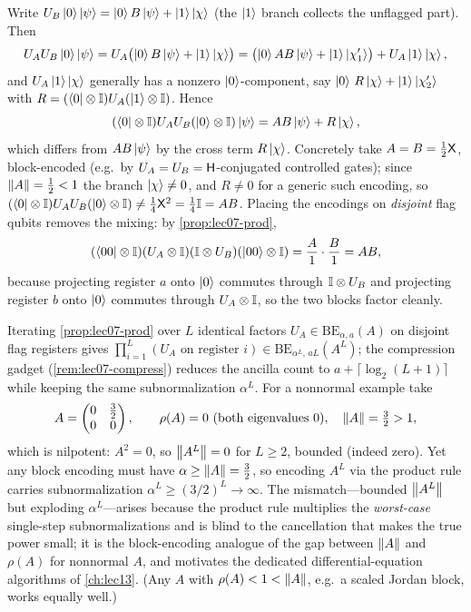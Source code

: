 \begin{solution}
Write $U_B\ket0\ket\psi=\ket0 B\ket\psi+\ket1\ket\chi$ (the $\ket1$ branch collects
the unflagged part). Then
\[
  U_A U_B\ket0\ket\psi
  =U_A\bigl(\ket0 B\ket\psi+\ket1\ket\chi\bigr)
  =\bigl(\ket0 A B\ket\psi+\ket1\ket{\chi'_1}\bigr)
   +U_A\ket1\ket\chi,
\]
and $U_A\ket1\ket\chi$ generally has a nonzero $\ket0$-component, say
$\ket0\,R\ket\chi+\ket1\ket{\chi'_2}$ with $R=(\bra0\otimes\mathbb{I})U_A(\ket1\otimes\mathbb{I})$.
Hence
\[
  (\bra0\otimes\mathbb{I})U_AU_B(\ket0\otimes\mathbb{I})\ket\psi=AB\ket\psi+R\ket\chi,
\]
which differs from $AB\ket\psi$ by the cross term $R\ket\chi$. Concretely take
$A=B=\tfrac12\mathsf{X}$, block-encoded (e.g.\ by $U_A=U_B=\mathsf{H}$-conjugated controlled
gates); since $\left\lVert A \right\rVert=\tfrac12<1$ the branch $\ket\chi\ne0$, and $R\ne0$ for a
generic such encoding, so $(\bra0\otimes\mathbb{I})U_AU_B(\ket0\otimes\mathbb{I})\ne\tfrac14\mathsf{X}^2
=\tfrac14\mathbb{I}=AB$. Placing the encodings on \emph{disjoint} flag qubits removes the
mixing: by \cref{prop:lec07-prod},
\[
  (\bra{00}\otimes\mathbb{I})(U_A\otimes\mathbb{I})(\mathbb{I}\otimes U_B)(\ket{00}\otimes\mathbb{I})
  =\frac{A}{1}\cdot\frac{B}{1}=AB,
\]
because projecting register $a$ onto $\ket0$ commutes through $\mathbb{I}\otimes U_B$ and
projecting register $b$ onto $\ket0$ commutes through $U_A\otimes\mathbb{I}$, so the two
blocks factor cleanly.
\end{solution}

\begin{solution}
Iterating \cref{prop:lec07-prod} over $L$ identical factors
$U_A\in\mathrm{BE}_{\alpha,a}(A)$ on disjoint flag registers gives
$\prod_{i=1}^{L}(U_A\text{ on register }i)\in\mathrm{BE}_{\alpha^L,\,aL}(A^L)$; the
compression gadget (\cref{rem:lec07-compress}) reduces the ancilla count to
$a+\lceil\log_2(L+1)\rceil$ while keeping the same subnormalization $\alpha^L$. For a
nonnormal example take
\[
  A=\begin{pmatrix}0&\tfrac32\\ 0&0\end{pmatrix},\qquad
  \rho(A)=0\ (\text{both eigenvalues }0),\quad \left\lVert A \right\rVert=\tfrac32>1,
\]
which is nilpotent: $A^2=0$, so $\left\lVert A^L \right\rVert=0$ for $L\ge2$, bounded (indeed zero).
Yet any block encoding must have $\alpha\ge\left\lVert A \right\rVert=\tfrac32$, so encoding $A^L$ via
the product rule carries subnormalization $\alpha^L\ge(3/2)^L\to\infty$. The
mismatch---bounded $\left\lVert A^L \right\rVert$ but exploding $\alpha^L$---arises because the product
rule multiplies the \emph{worst-case} single-step subnormalizations and is blind to
the cancellation that makes the true power small; it is the block-encoding analogue of
the gap between $\left\lVert A \right\rVert$ and $\rho(A)$ for nonnormal $A$, and motivates the
dedicated differential-equation algorithms of \cref{ch:lec13}. (Any $A$ with
$\rho(A)<1<\left\lVert A \right\rVert$, e.g.\ a scaled Jordan block, works equally well.)
\end{solution}

